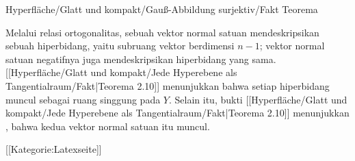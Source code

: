 {Hyperfläche/Glatt und kompakt/Gauß-Abbildung surjektiv/Fakt}
{Teorema}
{}
{

\faktzusatz {}
\faktzusatz {}

}
{

Melalui relasi ortogonalitas, sebuah vektor normal satuan mendeskripsikan sebuah hiperbidang, yaitu subruang vektor berdimensi $n-1$; vektor normal satuan negatifnya juga mendeskripsikan hiperbidang yang sama. [[Hyperfläche/Glatt und kompakt/Jede Hyperebene als Tangentialraum/Fakt|Teorema 2.10]]
menunjukkan bahwa setiap hiperbidang muncul sebagai ruang singgung pada $Y$. Selain itu, bukti
[[Hyperfläche/Glatt und kompakt/Jede Hyperebene als Tangentialraum/Fakt|Teorema 2.10]]
menunjukkan
 {} {,}
bahwa kedua vektor normal satuan itu muncul.

}

 [[Kategorie:Latexseite]]
